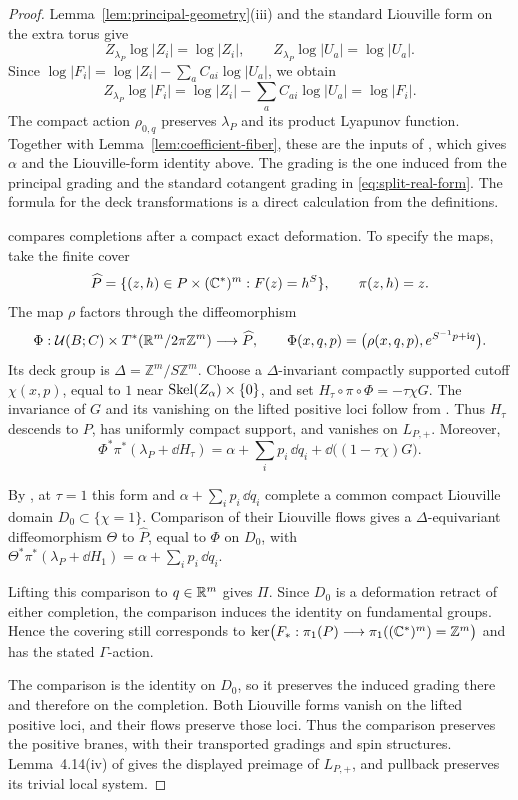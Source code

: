 \documentclass[12pt, letter]{amsart}
\theoremstyle{definition}
\newcommand{\Z}{\mathbb Z}
\numberwithin{equation}{section}
\begin{document}
\begin{proof}
Lemma~\ref{lem:principal-geometry}(iii) and the standard Liouville
form on the extra torus give
\[
 Z_{\lambda_P}\log|Z_i|=\log|Z_i|,
 \qquad Z_{\lambda_P}\log|U_a|=\log|U_a|.
\]
Since $\log|F_i|=\log|Z_i|-\sum_a C_{ai}\log|U_a|$, we obtain
\[
 Z_{\lambda_P}\log|F_i|
 =\log|Z_i|-\sum_a C_{ai}\log|U_a|
 =\log|F_i|.
\]
The compact action $\rho_{0,q}$ preserves $\lambda_P$ and its
product Lyapunov function. Together with
Lemma~\ref{lem:coefficient-fiber}, these are the inputs of
\cite[Lemma~4.14(ii)--(iv)]{HS}, which gives $\alpha$ and the
Liouville-form identity above.
The grading is the one induced from the principal grading and
the standard cotangent grading in \eqref{eq:split-real-form}.
The formula for the deck transformations is a direct calculation from the definitions.


\cite[Lemma~4.15]{HS} compares completions after a compact exact
deformation. To specify the maps, take the finite cover
\[
 \widehat P=\{(z,h)\in P\times(\mathbb C^*)^m:F(z)=h^S\},
 \qquad \pi(z,h)=z.
\]
The map $\rho$ factors through the diffeomorphism
\[
 \Phi:\cU(B;C)\times T^*(\R^m/2\pi\Z^m)\longrightarrow\widehat P,
 \qquad
 \Phi(x,q,p)=\bigl(\rho(x,q,p),e^{S^{-1}p+\mathrm iq}\bigr).
\]
Its deck group is $\Delta=\Z^m/S\Z^m$.
Choose a $\Delta$-invariant compactly supported cutoff $\chi(x,p)$,
equal to $1$ near $\operatorname{Skel}(Z_\alpha)\times\{0\}$, and set
$
 H_\tau\circ\pi\circ\Phi=-\tau\chi G.
$
The invariance of $G$ and its vanishing on the lifted positive
loci follow from \cite[Lemma~4.14(iv)]{HS}. Thus $H_\tau$ descends
to $P$, has uniformly compact support, and vanishes on $L_{P,+}$.
Moreover,
\[
 \Phi^*\pi^*(\lambda_P+\dd H_\tau)
 =\alpha+\sum_i p_i\,\dd q_i+\dd\bigl((1-\tau\chi)G\bigr).
\]

By \cite[Lemma~4.15]{HS}, at $\tau=1$ this form and
$\alpha+\sum_i p_i\,\dd q_i$ complete a common compact Liouville
domain $D_0\subset\{\chi=1\}$.
Comparison of their Liouville flows gives a $\Delta$-equivariant
diffeomorphism $\Theta$ to $\widehat P$, equal to $\Phi$ on $D_0$,
with
$
 \Theta^*\pi^*(\lambda_P+\dd H_1)
 =\alpha+\sum_i p_i\,\dd q_i.
$

Lifting this comparison to $q\in\mathbb R^m$ gives $\Pi$.
Since $D_0$ is a deformation retract of either completion,
the comparison induces the identity on fundamental groups.
Hence the covering still corresponds to
$
 \ker\bigl(F_*:\pi_1(P)\longrightarrow
                  \pi_1((\C^*)^m)=\Z^m\bigr)
$
and has the stated $\Gamma$-action.

The comparison is the identity on $D_0$, so it preserves the
induced grading there and therefore on the completion.
Both Liouville forms vanish on the lifted positive loci, and
their flows preserve those loci. Thus the comparison preserves
the positive branes, with their transported gradings and spin
structures. Lemma~4.14(iv) of \cite{HS} gives the displayed
preimage of $L_{P,+}$, and pullback preserves its trivial local system.
\end{proof}
\end{document}
